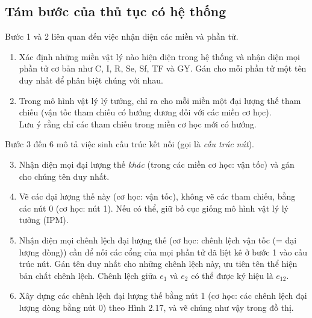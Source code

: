 \subsection{Tám bước của thủ tục có hệ thống}
Bước 1 và 2 liên quan đến việc nhận diện các miền và phần tử.
\begin{enumerate}
\item Xác định những miền vật lý nào hiện diện trong hệ thống và nhận diện mọi phần tử cơ bản như C, I, R, Se, Sf, TF và GY. Gán cho mỗi phần tử một tên duy nhất để phân biệt chúng với nhau.
\item Trong mô hình vật lý lý tưởng, chỉ ra cho mỗi miền một đại lượng thế tham chiếu (vận tốc tham chiếu có hướng dương đối với các miền cơ học).\\
Lưu ý rằng chỉ các tham chiếu trong miền cơ học mới có hướng.
\end{enumerate}

Bước 3 đến 6 mô tả việc sinh cấu trúc kết nối (gọi là \emph{cấu trúc nút}).
\begin{enumerate}
\setcounter{enumi}{2}
\item Nhận diện mọi đại lượng thế \emph{khác} (trong các miền cơ học: vận tốc) và gán cho chúng tên duy nhất.
\item Vẽ các đại lượng thế này (cơ học: vận tốc), không vẽ các tham chiếu, bằng các nút 0 (cơ học: nút 1). Nếu có thể, giữ bố cục giống mô hình vật lý lý tưởng (IPM).
\item Nhận diện mọi chênh lệch đại lượng thế (cơ học: chênh lệch vận tốc (= đại lượng dòng)) cần để nối các cổng của mọi phần tử đã liệt kê ở bước 1 vào cấu trúc nút. Gán tên duy nhất cho những chênh lệch này, ưu tiên tên thể hiện bản chất chênh lệch. Chênh lệch giữa $e_1$ và $e_2$ có thể được ký hiệu là $e_{12}$.
\item Xây dựng các chênh lệch đại lượng thế bằng nút 1 (cơ học: các chênh lệch đại lượng dòng bằng nút 0) theo Hình 2.17, và vẽ chúng như vậy trong đồ thị.
\end{enumerate}

